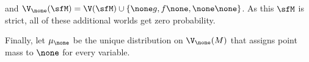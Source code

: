 

and $\V_\none(\sfM) = \V(\sfM) \cup \{ \none g, f \none, \none\none \}$. 
	As this $\sfM$ is strict, all of these additional worlds get zero probability. 
	
	Finally, let $\mu_\none$ be the unique distribution on $\V_\none(M)$ that assigns point mass to $\none$ for every variable.
